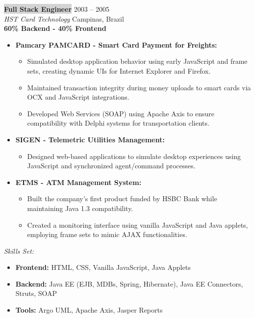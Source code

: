 \documentclass{resume} %
\begin{document}
\colorbox{lightgray}{\textbf{Full Stack Engineer}} \hfill 2003 -- 2005\\
\textit{HST Card Technology} \hfill Campinas, Brazil\\
\textbf{60\% Backend - 40\% Frontend}  
\begin{itemize}
    \item \textbf{Pamcary PAMCARD - Smart Card Payment for Freights:}
        \begin{itemize}
            \item Simulated desktop application behavior using early JavaScript and frame sets, creating dynamic UIs for Internet Explorer and Firefox.
            \item Maintained transaction integrity during money uploads to smart cards via OCX and JavaScript integrations.
            \item Developed Web Services (SOAP) using Apache Axis to ensure compatibility with Delphi systems for transportation clients.
        \end{itemize}
    \item \textbf{SIGEN - Telemetric Utilities Management:}
        \begin{itemize}
            \item Designed web-based applications to simulate desktop experiences using JavaScript and synchronized agent/command processes.
        \end{itemize}
    \item \textbf{ETMS - ATM Management System:}
        \begin{itemize}
            \item Built the company's first product funded by HSBC Bank while maintaining Java 1.3 compatibility.
            \item Created a monitoring interface using vanilla JavaScript and Java applets, employing frame sets to mimic AJAX functionalities.
        \end{itemize}
\end{itemize}

\textit{Skills Set:}  
\begin{itemize}
    \item \textbf{Frontend:} HTML, CSS, Vanilla JavaScript, Java Applets
    \item \textbf{Backend:} Java EE (EJB, MDBs, Spring, Hibernate), Java EE Connectors, Struts, SOAP
    \item \textbf{Tools:} Argo UML, Apache Axis, Jasper Reports
\end{itemize}  
\hfill
\end{document}
